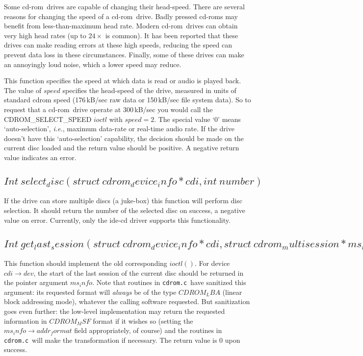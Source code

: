 \documentclass{article}
\def\cdrom{{\sc cd-rom}}
\def\cdromc{{\tt {cdrom.c}}}
\def\fo{\sl}                    %
\def\ie{{\fo i.e.}}
\begin{document}
Some \cdrom\ drives are capable of changing their head-speed. There
are several reasons for changing the speed of a \cdrom\ drive. Badly
pressed \cdrom s may benefit from less-than-maximum head rate. Modern
\cdrom\ drives can obtain very high head rates (up to $24\times$ is
common).  It has been reported that these drives can make reading
errors at these high speeds, reducing the speed can prevent data loss
in these circumstances.  Finally, some of these drives can
make an annoyingly loud noise, which a lower speed may reduce. %

This function specifies the speed at which data is read or audio is
played back. The value of $speed$ specifies the head-speed of the
drive, measured in units of standard cdrom speed (176\,kB/sec raw data
or 150\,kB/sec file system data). So to request that a \cdrom\ drive
operate at 300\,kB/sec you would call the CDROM_SELECT_SPEED $ioctl$
with $speed=2$. The special value `0' means `auto-selection', \ie,
maximum data-rate or real-time audio rate. If the drive doesn't have
this `auto-selection' capability, the decision should be made on the
current disc loaded and the return value should be positive. A negative
return value indicates an error.

\subsection{$Int\ select_disc(struct\ cdrom_device_info * cdi, int\ number)$}

If the drive can store multiple discs (a juke-box) this function
will perform disc selection. It should return the number of the
selected disc on success, a negative value on error. Currently, only
the ide-cd driver supports this functionality.

\subsection{$Int\ get_last_session(struct\ cdrom_device_info * cdi, struct\
  cdrom_multisession * ms_info)$}

This function should implement the old corresponding $ioctl()$. For
device $cdi\to dev$, the start of the last session of the current disc
should be returned in the pointer argument $ms_info$. Note that
routines in \cdromc\ have sanitized this argument: its requested
format will {\em always\/} be of the type $CDROM_LBA$ (linear block
addressing mode), whatever the calling software requested. But
sanitization goes even further: the low-level implementation may
return the requested information in $CDROM_MSF$ format if it wishes so
(setting the $ms_info\rightarrow addr_format$ field appropriately, of
course) and the routines in \cdromc\ will make the transformation if
necessary. The return value is 0 upon success.
\end{document}
